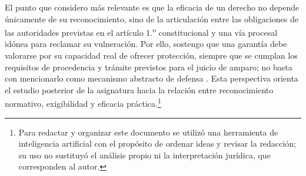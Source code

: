 \documentclass[
  spanish,
  letterpaper, oneside
]{article}
\begin{document}
  El punto que considero más relevante es que la eficacia de un derecho no depende únicamente de su reconocimiento, sino de la articulación entre las obligaciones de las autoridades previstas en el artículo 1.\textsuperscript{o} constitucional y una vía procesal idónea para reclamar su vulneración. Por ello, sostengo que una garantía debe valorarse por su capacidad real de ofrecer protección, siempre que se cumplan los requisitos de procedencia y trámite previstos para el juicio de amparo; no basta con mencionarlo como mecanismo abstracto de defensa \citep{cpeum2026,leyAmparo2026}. Esta perspectiva orienta el estudio posterior de la asignatura hacia la relación entre reconocimiento normativo, exigibilidad y eficacia práctica.\footnote{Para redactar y organizar este documento se utilizó una herramienta de inteligencia artificial con el propósito de ordenar ideas y revisar la redacción; su uso no sustituyó el análisis propio ni la interpretación jurídica, que corresponden al autor.}


\clearpage
\nocite{unadmSitioWeb,unadmMallaDerecho2024,cpeum2026,leyAmparo2026,normasApaReferencias2020}

\end{document}

